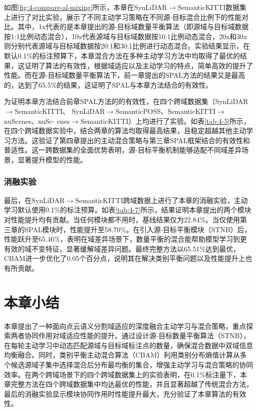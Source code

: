     \vspace{-0.35cm}
    如图\ref{fig:4-compare-al-mixing}所示，本章在SynLiDAR$\to$SemanticKITTI数据集上进行了对比实验，展示了不同主动学习策略在不同源-目标混合比例下的性能对比。其中，1x代表的是本章提出的源-目标域数量平衡算法（即源域与目标域数据按1:1比例动态混合），10x代表源域与目标域数据按10:1比例动态混合，20x和30x则分别代表源域与目标域数据按20:1和30:1比例进行动态混合。实验结果显示，在默认0.1\%的标注预算下，本章混合方法在多种主动学习方法中均取得了最优的结果，这证明了算法的有效性，根据域适应以及主动学习的特点，简单高效的提升了性能。而在源-目标域数量平衡算法下，前一章提出的SPAL方法的结果又是最高的，达到了65.5\%的结果，这证明了SPAL与本章方法结合的有效性。
    
    为证明本章方法结合前章SPAL方法的的有效性，在四个跨域数据集（SynLiDAR$\to$SemanticKITTI、
    SynLiDAR$\to$SemanticPOSS、SemanticKITTI$\to$nuScenes、nuSc-
    enes$\to$SemanticKITTI）上均进行了实验。如表\ref{tab:4-5}所示，在四个跨域数据实验中，结合两章的算法均取得最高结果，且稳定超越其他主动学习方法。这验证了第四章提出的主动混合策略与第三章SPAL框架结合的有效性和普适性。这一跨数据集的全面优势表明，源-目标平衡机制能够适配不同域差异场景，显著提升模型的性能。
    
    \subsubsection{消融实验}
    最后，在SynLiDAR$\to$SemanticKITTI跨域数据上进行了本章的消融实验，主动学习默认使用0.1\%的标注预算。如表\ref{tab:4-7}所示，结果证明本章提出的两个模块对性能提升均有贡献。当任何模块都不用时，基线结果仅为22.84\%。当仅使用第三章的SPAL模块时，性能提升至58.70\%。在引入源-目标平衡模块（STNB）后，性能跃升至65.46\%，表明在域差异场景下，数量平衡的混合能帮助模型学习到更有效的域不变特征，显著缓解域差异问题。最终完整方法以65.51\%达到最优，CBAM进一步优化了0.05个百分点，说明其在解决类别平衡问题以及性能提升上也有所贡献。
    
    
    \section{本章小结}
    本章提出了一种面向点云语义分割域适应的深度融合主动学习与混合策略，重点探索两者协同作用对域适应性能的提升。通过设计源-目标数量平衡算法（STNB），在每轮主动学习中动态匹配源域与目标域标注点的数量，确保混合数据中双域信息均衡融合。同时，类别平衡主动混合算法（CBAM）利用类别分布熵值计算从多个候选源域子集中选择混合后分布最均衡的集合，增强主动学习与混合策略的协同效率。在两个跨域场景下的四个跨域数据集上的实验表明，在0.1\%标注量下，本章完整方法在四个跨域数据集中均达最优的性能，并且显著超越了传统混合方法，最后的消融实验显示模块协同作用时性能提升最大，充分验证了本章算法的有效性。
